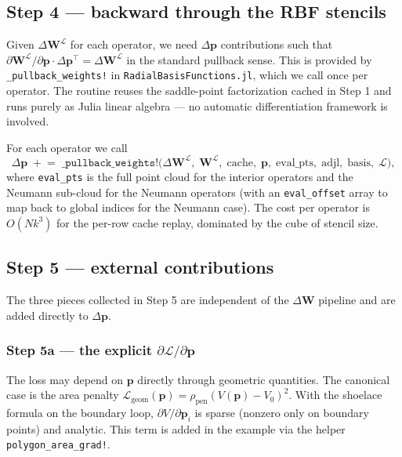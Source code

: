 \documentclass[11pt,a4paper]{article}
\newcommand{\mat}[1]{\mathbf{#1}}
\newcommand{\vect}[1]{\boldsymbol{#1}}
\newcommand{\pts}{\vect{p}}
\newcommand{\Loss}{\mathcal{L}}
\begin{document}
\subsection{Step 4 --- backward through the RBF stencils}
\label{sec:step4}

Given $\Delta\mat W^{\mathcal L}$ for each operator, we need
$\Delta\pts$ contributions such that
$\partial\mat W^{\mathcal L}/\partial\pts \cdot \Delta\pts^\top
= \Delta\mat W^{\mathcal L}$ in the standard pullback sense. This
is provided by \texttt{\_pullback\_weights!} in
\texttt{RadialBasisFunctions.jl}, which we call once per operator.
The routine reuses the saddle-point factorization cached in Step 1
and runs purely as Julia linear algebra --- no automatic
differentiation framework is involved.

For each operator we call
\begin{equation}
  \Delta\pts \;\mathrel{+}=\;
  \texttt{\_pullback\_weights!}\big(
    \Delta\mat W^{\mathcal L},\;
    \mat W^{\mathcal L},\;
    \text{cache},\;
    \pts,\;
    \text{eval\_pts},\;
    \text{adjl},\;
    \text{basis},\;
    \mathcal L
  \big),
\end{equation}
where \texttt{eval\_pts} is the full point cloud for the interior
operators and the Neumann sub-cloud for the Neumann operators
(with an \texttt{eval\_offset} array to map back to global indices
for the Neumann case). The cost per operator is
$O(N k^3)$ for the per-row cache replay, dominated by the cube of
stencil size.

\subsection{Step 5 --- external contributions}

The three pieces collected in Step 5 are independent of the
$\Delta\mat W$ pipeline and are added directly to $\Delta\pts$.

\subsubsection{Step 5a --- the explicit
\texorpdfstring{$\partial\Loss/\partial\pts$}{dL/dp}}
\label{sec:step5-explicit}

The loss may depend on $\pts$ directly through geometric quantities.
The canonical case is the area penalty
$\Loss_{\text{geom}}(\pts) = \rho_{\text{pen}}(V(\pts) - V_0)^2$.
With the shoelace formula on the boundary loop,
$\partial V/\partial \pts_i$ is sparse (nonzero only on boundary
points) and analytic. This term is added in the example via the
helper \texttt{polygon\_area\_grad!}.
\end{document}
